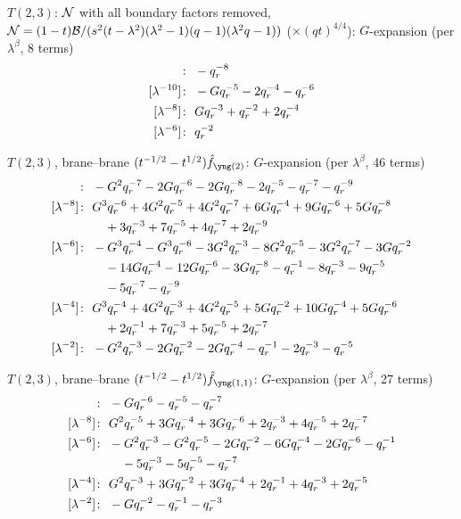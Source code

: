 $T(2,3)$: $\mathcal{N}$ with all boundary factors removed, $\mathcal{N} = (1-t)\mathcal{B}/(s^2(t-\lambda^2)(\lambda^2-1)(q-1)(\lambda^2q-1))$ ($\times (qt)^{4/4}$): $G$-expansion (per $\lambda^\beta$, 8 terms)
\begin{align*}
[\lambda^{-12}]\colon\ & -\qr^{-8} \\
[\lambda^{-10}]\colon\ & -G \qr^{-5} -2 \qr^{-4} -\qr^{-6} \\
[\lambda^{-8}]\colon\ & G \qr^{-3} +\qr^{-2} +2 \qr^{-4} \\
[\lambda^{-6}]\colon\ & \qr^{-2}
\end{align*}

$T(2,3)$, brane--brane $(t^{-1/2} - t^{1/2})\hat f_{\ytwo}$: $G$-expansion (per $\lambda^\beta$, 46 terms)
\begin{align*}
[\lambda^{-10}]\colon\ & -G^{2} \qr^{-7} -2 G \qr^{-6} -2 G \qr^{-8} -2 \qr^{-5} -\qr^{-7} -\qr^{-9} \\
[\lambda^{-8}]\colon\ & G^{3} \qr^{-6} +4 G^{2} \qr^{-5} +4 G^{2} \qr^{-7} +6 G \qr^{-4} +9 G \qr^{-6} +5 G \qr^{-8} \\
& \quad +3 \qr^{-3} +7 \qr^{-5} +4 \qr^{-7} +2 \qr^{-9} \\
[\lambda^{-6}]\colon\ & -G^{3} \qr^{-4} -G^{3} \qr^{-6} -3 G^{2} \qr^{-3} -8 G^{2} \qr^{-5} -3 G^{2} \qr^{-7} -3 G \qr^{-2} \\
& \quad -14 G \qr^{-4} -12 G \qr^{-6} -3 G \qr^{-8} -\qr^{-1} -8 \qr^{-3} -9 \qr^{-5} \\
& \quad -5 \qr^{-7} -\qr^{-9} \\
[\lambda^{-4}]\colon\ & G^{3} \qr^{-4} +4 G^{2} \qr^{-3} +4 G^{2} \qr^{-5} +5 G \qr^{-2} +10 G \qr^{-4} +5 G \qr^{-6} \\
& \quad +2 \qr^{-1} +7 \qr^{-3} +5 \qr^{-5} +2 \qr^{-7} \\
[\lambda^{-2}]\colon\ & -G^{2} \qr^{-3} -2 G \qr^{-2} -2 G \qr^{-4} -\qr^{-1} -2 \qr^{-3} -\qr^{-5}
\end{align*}

$T(2,3)$, brane--brane $(t^{-1/2} - t^{1/2})\hat f_{\yoneone}$: $G$-expansion (per $\lambda^\beta$, 27 terms)
\begin{align*}
[\lambda^{-10}]\colon\ & -G \qr^{-6} -\qr^{-5} -\qr^{-7} \\
[\lambda^{-8}]\colon\ & G^{2} \qr^{-5} +3 G \qr^{-4} +3 G \qr^{-6} +2 \qr^{-3} +4 \qr^{-5} +2 \qr^{-7} \\
[\lambda^{-6}]\colon\ & -G^{2} \qr^{-3} -G^{2} \qr^{-5} -2 G \qr^{-2} -6 G \qr^{-4} -2 G \qr^{-6} -\qr^{-1} \\
& \quad -5 \qr^{-3} -5 \qr^{-5} -\qr^{-7} \\
[\lambda^{-4}]\colon\ & G^{2} \qr^{-3} +3 G \qr^{-2} +3 G \qr^{-4} +2 \qr^{-1} +4 \qr^{-3} +2 \qr^{-5} \\
[\lambda^{-2}]\colon\ & -G \qr^{-2} -\qr^{-1} -\qr^{-3}
\end{align*}

